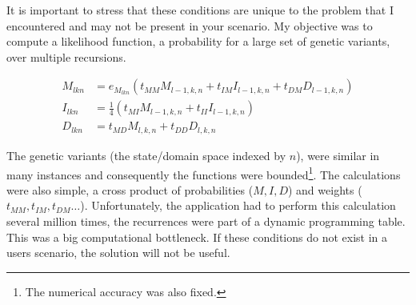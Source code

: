\documentclass{article}
\begin{document}
It is important to stress that these conditions are unique to the problem that
I encountered and may not be present in your scenario.
My objective was to compute a likelihood function,
a probability for a large set of genetic variants,
over multiple recursions.

\begin{align}
  M_{lkn} &= e_{M_{lkn}}(t_{MM}M_{l-1,k,n} + t_{IM}I_{l-1,k,n} + t_{DM}D_{l-1,k,n})
  \nonumber \\
  I_{lkn} &= \frac{1}{4}(t_{MI}M_{l-1,k,n} + t_{II}I_{l-1,k,n}) \nonumber \\
  D_{lkn} &= t_{MD}M_{l,k,n} + t_{DD}D_{l,k,n} \nonumber
\end{align}

The genetic variants (the state/domain space indexed by $n$),
were similar in many instances and consequently the functions were
bounded\footnote{The numerical accuracy was also fixed.}.
The calculations were also simple,
a cross product of probabilities ($M, I, D$) and weights ($t_{MM}, t_{IM}, t_{DM} \ldots$).
Unfortunately,
the application had to perform this calculation several million times,
the recurrences were part of a dynamic programming table.
This was a big computational bottleneck.
If these conditions do not exist in a users scenario,
the solution will not be useful.
\end{document}
